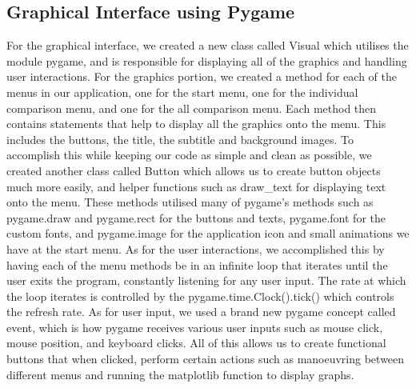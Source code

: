 \documentclass[fontsize=11pt]{article}
\begin{document}
\subsection{Graphical Interface using Pygame}
For the graphical interface, we created a new class called Visual which utilises the module pygame, and is responsible for displaying all of the graphics and handling user interactions. For the graphics portion, we created a method for each of the menus in our application, one for the start menu, one for the individual comparison menu, and one for the all comparison menu. Each method then contains statements that help to display all the graphics onto the menu. This includes the buttons, the title, the subtitle and background images. To accomplish this while keeping our code as simple and clean as possible, we created another class called Button which allows us to create button objects much more easily, and helper functions such as draw\_text for displaying text onto the menu. These methods utilised many of pygame’s methods such as pygame.draw and pygame.rect for the buttons and texts, pygame.font for the custom fonts, and pygame.image for the application icon and small animations we have at the start menu. As for the user interactions, we accomplished this by having each of the menu methods be in an infinite loop that iterates until the user exits the program, constantly listening for any user input. The rate at which the loop iterates is controlled by the pygame.time.Clock().tick() which controls the refresh rate. As for user input, we used a brand new pygame concept called event, which is how pygame receives various user inputs such as mouse click, mouse position, and keyboard clicks. All of this allows us to create functional buttons that when clicked, perform certain actions such as manoeuvring between different menus and running the matplotlib function to display graphs.

\newpage
\end{document}
